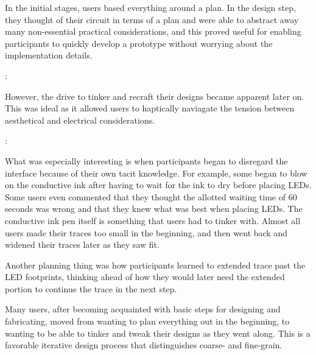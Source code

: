 \documentclass{sigchi}
\begin{document}
  In the initial stages, users based everything around a plan. In the design step, they thought of their circuit in terms of a plan and were able to abstract away many non-essential practical considerations, and this proved useful for enabling participants to quickly develop a prototype without worrying about the implementation details.
  
  \begin{myquote}
   \vspace{-2pt}
    :
    \vspace{-2pt}
  \end{myquote}
  
  However, the drive to tinker and recraft their designs became apparent later on. This was ideal as it allowed users to haptically naviagate the tension between aesthetical and electrical considerations.
  
  \begin{myquote}
   \vspace{-2pt}
    :
    \vspace{-2pt}
  \end{myquote}
  
  What was especially interesting is when participants began to disregard the interface because of their own tacit knowledge. For example, some began to blow on the conductive ink after having to wait for the ink to dry before placing LEDs. Some users even commented that they thought the allotted waiting time of 60 seconds was wrong and that they knew what was best when placing LEDs. The conductive ink pen itself is something that users had to tinker with. Almost all users made their traces too small in the beginning, and then went back and widened their traces later as they saw fit.
  
  Another planning thing was how participants learned to extended trace past the LED footprints, thinking ahead of how they would later need the extended portion to continue the trace in the next step.
  
  Many users, after becoming acquainted with basic steps for designing and fabricating, moved from wanting to plan everything out in the beginning, to wanting to be able to tinker and tweak their designs as they went along. This is a favorable iterative design process that distinguishes coarse- and fine-grain.
\end{document}
